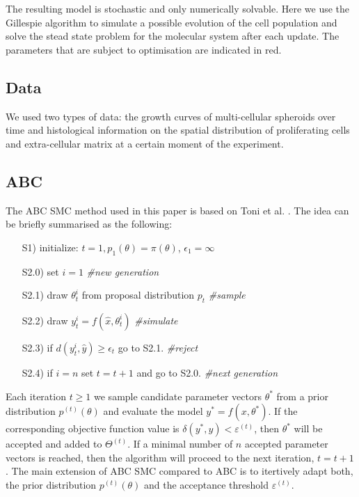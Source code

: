 \documentclass[10pt,letterpaper]{article}
\begin{document}
The resulting model is stochastic and only numerically solvable. Here we use the Gillespie algorithm to simulate a possible evolution of the cell population and solve the stead state problem for the molecular system after each update. The parameters that are subject to optimisation are indicated in red.

\subsection*{Data} 
We used two types of data: the growth curves of multi-cellular spheroids over time and histological information on the spatial distribution of proliferating cells and extra-cellular matrix at a certain moment of the experiment.

\subsection*{ABC}
The ABC SMC method used in this paper is based on Toni et al. \cite{ToniWel2009}. The idea can be briefly summarised as the following: 

\begin{itemize}
\item[S1)] initialize: $t=1, p_{1}(\theta) = \pi(\theta)$, $\epsilon_{1} = \infty$
\item[S2.0)] set $i = 1$ \emph{\#new generation }
\item[S2.1)] draw $\theta_{t}^{i}$ from proposal distribution $p_{t}$ \emph{\#sample}
\item[S2.2)] draw $y_{t}^{i} = f(\hat{x}, \theta_{t}^{i})$ \emph{\#simulate}
\item[S2.3)] if $d( y_{t}^{i}, \hat{y}) \ge \epsilon_t$ go to S2.1. \emph{\#reject}
\item[S2.4)] if $i = n$ set $t=t+1$ and go to S2.0.  \emph{\#next generation}
\end{itemize}

Each iteration $t \ge 1$ we sample candidate parameter vectors $\theta^*$ from a prior distribution $p^{(t)}(\theta)$ and evaluate the model $y^{*} = f(x, \theta^*)$. If the corresponding  objective function value is $\delta(y^{*}, y) < \varepsilon^{(t)}$, then $\theta^*$ will be accepted and added to $\Theta^{(t)}$. If a minimal number of $n$ accepted parameter vectors is reached, then the algorithm will proceed to the next iteration, $t = t+1$. The main extension of ABC SMC compared to ABC is to itertively adapt both, the prior distribution $p^{(t)}(\theta)$ and the acceptance threshold $\varepsilon^{(t)}$.
\end{document}
